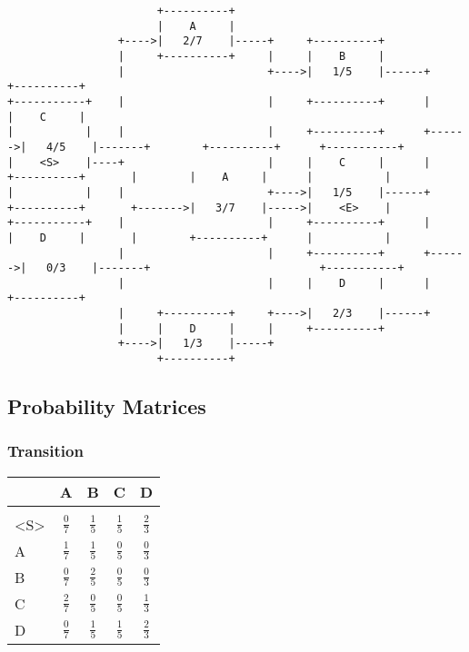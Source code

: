 \documentclass{article}
\begin{document}
{\begin{verbatim}
                       +----------+
                       |    A     |
                 +---->|   2/7    |-----+     +----------+
                 |     +----------+     |     |    B     |
                 |                      +---->|   1/5    |------+       +----------+
+-----------+    |                      |     +----------+      |       |    C     |
|           |    |                      |     +----------+      +------>|   4/5    |-------+        +----------+      +-----------+
|    <S>    |----+                      |     |    C     |      |       +----------+       |        |    A     |      |           |
|           |    |                      +---->|   1/5    |------+       +----------+       +------->|   3/7    |----->|    <E>    |
+-----------+    |                      |     +----------+      |       |    D     |       |        +----------+      |           |
                 |                      |     +----------+      +------>|   0/3    |-------+                          +-----------+
                 |                      |     |    D     |      |       +----------+
                 |     +----------+     +---->|   2/3    |------+
                 |     |    D     |     |     +----------+
                 +---->|   1/3    |-----+
                       +----------+
\end{verbatim}
}
\subsection{Probability Matrices}
\subsubsection{Transition}
\small
\begin{center}
\begin{tabular}{l|| c c c c}
\hline\hline
& 	A&	B&	C&	D	\\
\hline\hline
\\
<S>&		\(\frac{0}{7}\)&	\(\frac{1}{5}\)&	\(\frac{1}{5}\)&	\(\frac{2}{3}\)\\[1ex]
A&		\(\frac{1}{7}\)&	\(\frac{1}{5}\)&	\(\frac{0}{5}\)&	\(\frac{0}{3}\)\\[1ex]
B&		\(\frac{0}{7}\)&	\(\frac{2}{5}\)&	\(\frac{0}{5}\)&	\(\frac{0}{3}\)\\[1ex]
C&		\(\frac{2}{7}\)& 	\(\frac{0}{5}\)&	\(\frac{0}{5}\)&	\(\frac{1}{3}\)\\[1ex]
D&		\(\frac{0}{7}\)&	\(\frac{1}{5}\)&	\(\frac{1}{5}\)&	\(\frac{2}{3}\)\\[1ex]
\hline
\end{tabular}
\end{center}
\end{document}
